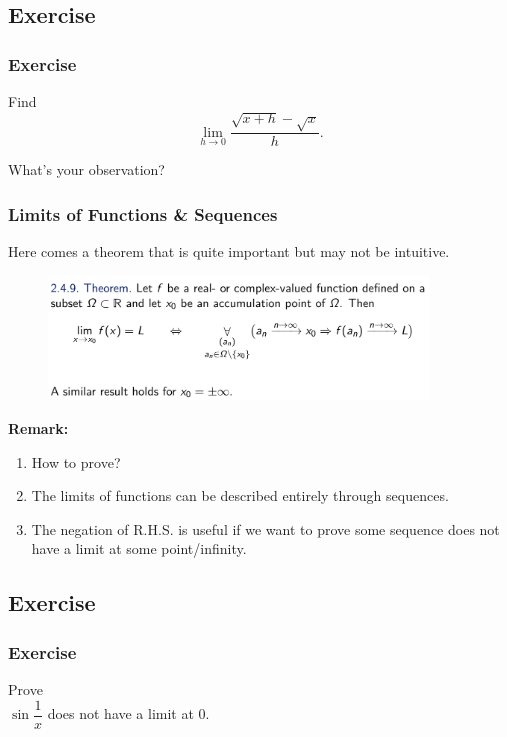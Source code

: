 \documentclass[10pt, t]{beamer}
\begin{document}
\subsection{Exercise}
\begin{frame}
    \frametitle{Exercise}

    Find $$\underset{h\to 0}{\lim} {\dfrac{\sqrt{x+h}-\sqrt{x}}{h}}.$$

    What's your observation? 
\end{frame}

\begin{frame}
    \frametitle{Limits of Functions \& Sequences}

    Here comes a theorem that is quite important but may not be intuitive.
    \begin{figure}[H]
    \centering
    \includegraphics[width=0.9\textwidth]{2020-10-14-11-59-41.png}
    \end{figure}
    
    \textbf{Remark:}
    \begin{enumerate}
        \item How to prove?
        \item The limits of functions can be described entirely through sequences.
        \item The negation of R.H.S. is useful if we want to prove some sequence does not have a limit at some point/infinity.
    \end{enumerate}
\end{frame}
\subsection{Exercise}
\begin{frame}
    \frametitle{Exercise}

    Prove\\
    \centering
    $\sin \dfrac{1}{x}$ does not have a limit at $0$.
\end{frame}
\end{document}
